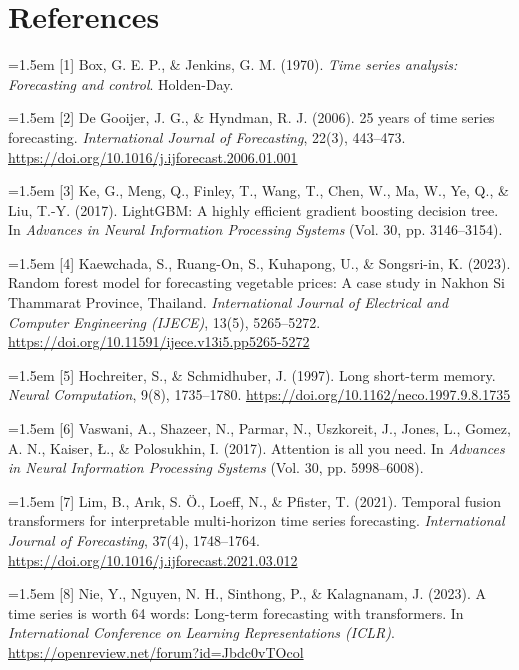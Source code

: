 \documentclass[review,3p,times]{elsarticle}
\begin{document}
\section*{References}
\begingroup
\setlength{\parindent}{0pt}
\hangindent=1.5em [1] Box, G. E. P., \& Jenkins, G. M. (1970). \emph{Time series analysis: Forecasting and control}. Holden-Day.\par\medskip
\hangindent=1.5em [2] De Gooijer, J. G., \& Hyndman, R. J. (2006). 25 years of time series forecasting. \emph{International Journal of Forecasting}, 22(3), 443--473. \url{https://doi.org/10.1016/j.ijforecast.2006.01.001}\par\medskip
\hangindent=1.5em [3] Ke, G., Meng, Q., Finley, T., Wang, T., Chen, W., Ma, W., Ye, Q., \& Liu, T.-Y. (2017). LightGBM: A highly efficient gradient boosting decision tree. In \emph{Advances in Neural Information Processing Systems} (Vol. 30, pp. 3146--3154).\par\medskip
\hangindent=1.5em [4] Kaewchada, S., Ruang-On, S., Kuhapong, U., \& Songsri-in, K. (2023). Random forest model for forecasting vegetable prices: A case study in Nakhon Si Thammarat Province, Thailand. \emph{International Journal of Electrical and Computer Engineering (IJECE)}, 13(5), 5265--5272. \url{https://doi.org/10.11591/ijece.v13i5.pp5265-5272}\par\medskip
\hangindent=1.5em [5] Hochreiter, S., \& Schmidhuber, J. (1997). Long short-term memory. \emph{Neural Computation}, 9(8), 1735--1780. \url{https://doi.org/10.1162/neco.1997.9.8.1735}\par\medskip
\hangindent=1.5em [6] Vaswani, A., Shazeer, N., Parmar, N., Uszkoreit, J., Jones, L., Gomez, A. N., Kaiser, Ł., \& Polosukhin, I. (2017). Attention is all you need. In \emph{Advances in Neural Information Processing Systems} (Vol. 30, pp. 5998--6008).\par\medskip
\hangindent=1.5em [7] Lim, B., Ar\i{}k, S. Ö., Loeff, N., \& Pfister, T. (2021). Temporal fusion transformers for interpretable multi-horizon time series forecasting. \emph{International Journal of Forecasting}, 37(4), 1748--1764. \url{https://doi.org/10.1016/j.ijforecast.2021.03.012}\par\medskip
\hangindent=1.5em [8] Nie, Y., Nguyen, N. H., Sinthong, P., \& Kalagnanam, J. (2023). A time series is worth 64 words: Long-term forecasting with transformers. In \emph{International Conference on Learning Representations (ICLR)}. \url{https://openreview.net/forum?id=Jbdc0vTOcol}\par\medskip
\end{document}
